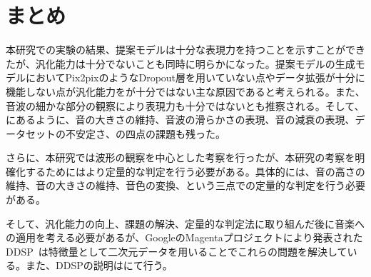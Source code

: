 \chapter{まとめ}

本研究での実験の結果、提案モデルは十分な表現力を持つことを示すことができたが、汎化能力は十分でないことも同時に明らかになった。提案モデルの生成モデルにおいてPix2pixのようなDropout層を用いていない点やデータ拡張が十分に機能しない点が汎化能力をが十分ではない主な原因であると考えられる。また、音波の細かな部分の観察により表現力も十分ではないとも推察される。そして、にあるように、音の大きさの維持、音波の滑らかさの表現、音の減衰の表現、データセットの不安定さ、の四点の課題も残った。

さらに、本研究では波形の観察を中心とした考察を行ったが、本研究の考察を明確化するためにはより定量的な判定を行う必要がある。具体的には、音の高さの維持、音の大きさの維持、音色の変換、という三点での定量的な判定を行う必要がある。

そして、汎化能力の向上、課題の解決、定量的な判定法に取り組んだ後に音楽への適用を考える必要があるが、GoogleのMagentaプロジェクトにより発表されたDDSP~\cite{DDSP}は特徴量として二次元データを用いることでこれらの問題を解決している。また、DDSPの説明はにて行う。